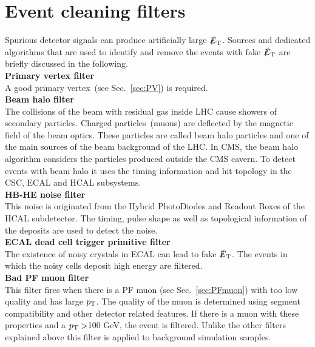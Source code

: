 \section{Event cleaning filters}
\label{sec:filters}
Spurious detector signals can produce artificially large $\slashed{E}_{\rm T}$. Sources and dedicated algorithms that are used to identify and remove the events with fake $\slashed{E}_{\rm T}$ are briefly discussed in the following.\\
\textbf{Primary vertex filter}\\
A good primary vertex~(see Sec.~\ref{sec:PV}) is required.\\
\textbf{Beam halo filter}\\
The collisions of the beam with residual gas inside LHC cause showers of secondary particles. Charged particles~(muons) are deflected by the magnetic field of the beam optics. These particles are called beam halo particles and one of the main sources of the beam background of the LHC. In CMS, the beam halo algorithm considers the particles produced outside the CMS cavern. To detect events with beam halo it uses the timing information and hit topology in the CSC, ECAL and HCAL subsystems. \\
\textbf{HB-HE noise filter}\\
This noise is originated from the Hybrid PhotoDiodes and Readout Boxes of the HCAL subdetector. The timing, pulse shape as well as topological information of the deposits are used to detect the noise.\\
\textbf{ECAL dead cell trigger primitive filter}\\
The existence of noisy crystals in ECAL can lead to fake $\slashed{E}_{\rm T}$. The events in which the noisy cells deposit high energy are filtered.\\
\textbf{Bad PF muon filter}\\
This filter fires when there is a PF muon (see Sec.~\ref{sec:PFmuon}) with too low quality and has large $p_{\rm T}$. The quality of the muon is determined using segment compatibility and other detector related features. If there is a muon with these properties and a $p_{\rm T}>$100 GeV, the event is filtered. Unlike the other filters explained above this filter is applied to background simulation samples. \\
